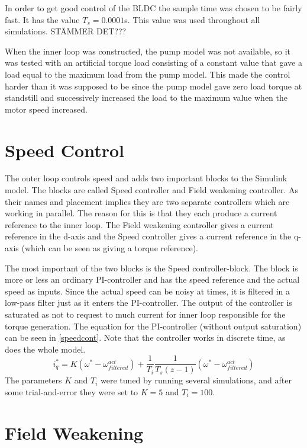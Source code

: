 \documentclass{LTHthesis}
\begin{document}
In order to get good control of the BLDC the sample time was chosen to be fairly fast. It has the value $T_{s}=0.0001$s. This value was used throughout all simulations. STÄMMER DET???

When the inner loop was constructed, the pump model was not available, so it was tested with an artificial torque load consisting of a constant value that gave a load equal to the maximum load from the pump model. This made the control harder than it was supposed to be since the pump model gave zero load torque at standstill and successively increased the load to the maximum value when the motor speed increased.
\section{Speed Control}
The outer loop controls speed and adds two important blocks to the Simulink model. The blocks are called Speed controller and Field weakening controller. As their names and placement implies they are two separate controllers which are working in parallel. The reason for this is that they each produce a current reference to the inner loop. The Field weakening controller gives a current reference in the d-axis and the Speed controller gives a current reference in the q-axis (which can be seen as giving a torque reference).

The most important of the two blocks is the Speed controller-block. The block is more or less an ordinary PI-controller and has the speed reference and the actual speed as inputs. Since the actual speed can be noisy at times, it is filtered in a low-pass filter just as it enters the PI-controller. The output of the controller is saturated as not to request to much current for inner loop responsible for the torque generation. The equation for the PI-controller (without output saturation) can be seen in \eqref{speedcont}. Note that the controller works in discrete time, as does the whole model.
\begin{equation} \label{speedcont}
i_q^*=K(\omega^*-\omega^{act}_{filtered})+\frac{1}{T_i}\frac{1}{T_s(z-1)}(\omega^*-\omega^{act}_{filtered})
\end{equation}
The parameters $K$ and $T_i$ were tuned by running several simulations, and after some trial-and-error they were set to $K=5$ and $T_i=100$.
\section{Field Weakening}
\end{document}
